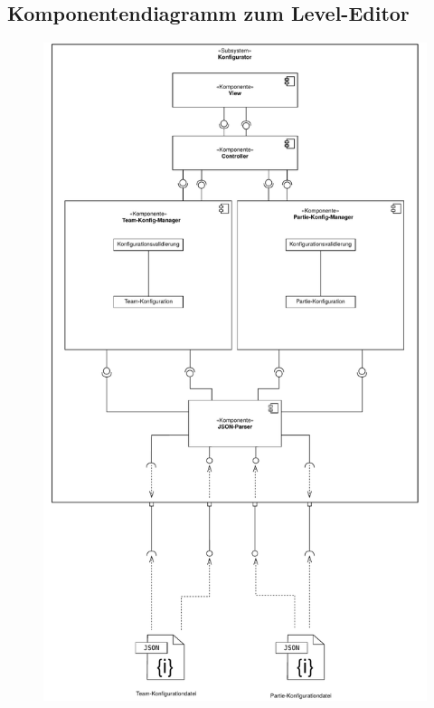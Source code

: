 \subsection{Komponentendiagramm zum Level-Editor}
\begin{figure}[H]
    \centering
    \includegraphics[scale=0.6]{../Meilenstein05/images/Konfigurator.pdf}
\end{figure}